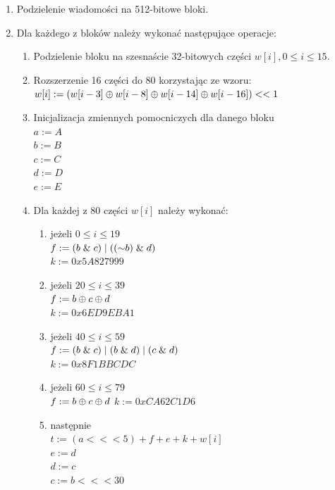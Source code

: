 \begin{enumerate}
\begin{enumerate}
{					00000000 00000000 00000000 00000031 }
		\end{enumerate}
	\item Podzielenie wiadomości na 512-bitowe bloki.
	\item Dla każdego z bloków należy wykonać następujące operacje:
		\begin{enumerate}
			\item Podzielenie bloku na szesnaście 32-bitowych części $w[i], 0 \leq i \leq 15$.
			\item Rozszerzenie 16 części do 80 korzystając ze wzoru: \\
				$w[i] := (w[i-3] \mathbin{\oplus} w[i-8] \mathbin{\oplus} w[i-14] \mathbin{\oplus} w[i-16]) << 1$
			\item Inicjalizacja zmiennych pomocniczych dla danego bloku \\
				$a := A$ \\
				$b := B$ \\
				$c := C$ \\
				$d := D$ \\
				$e := E$ 
			\item Dla każdej z 80 części $w[i]$ należy wykonać:
				\begin{enumerate}
					\item jeżeli $0 \leq i \leq 19$ \\
			        	$f := (b \mathrel{\&} c) \mathrel{|} ((\mathord{\sim} b) \mathrel{\&} d)$ \\
			            $k := 0x5A827999$
					\item jeżeli $20 \leq i \leq 39$ \\
           				$f := b \mathbin{\oplus} c \mathbin{\oplus} d$ \\
          				$k := 0x6ED9EBA1$
				    \item jeżeli $40 \leq i \leq 59$ \\
			        	$f := (b \mathrel{\&} c) \mathrel{|} (b \mathrel{\&} d) \mathrel{|} (c \mathrel{\&} d)$ \\
           				$k := 0x8F1BBCDC$
        			\item jeżeli $60 \leq i \leq 79$ \\
			            $f := b \mathbin{\oplus} c \mathbin{\oplus} d$
   	        			$k := 0xCA62C1D6$
            		\item następnie \\
           				$t := (a <<< 5) + f + e + k + w[i]$ \\
				        $e := d$ \\
				        $d := c$\\
				        $c := b <<< 30$\\

\end{enumerate}
\end{enumerate}
\end{enumerate}
